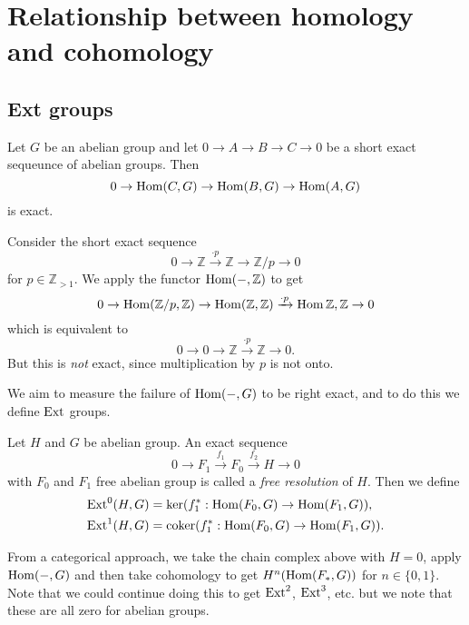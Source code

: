 \section{Relationship between homology and cohomology}

\subsection{Ext groups}

\begin{lemma}
    Let $G$ be an abelian group and let $0 \to A \to B \to C \to 0$ be a short exact sequeunce of abelian groups. Then
    \[ 0 \to \operatorname{Hom}(C,G) \to \operatorname{Hom}(B,G) \to \operatorname{Hom}(A,G) \]
    is exact.
\end{lemma}

\begin{example}
    Consider the short exact sequence
    \[ 0 \to \mathbb Z \xrightarrow{\cdot p} \mathbb Z \to \mathbb Z/p \to 0 \]
    for $p \in \mathbb Z_{> 1}$. We apply the functor $\operatorname{Hom}(-, \mathbb Z)$ to get
    \[ 0 \to \operatorname{Hom}(\mathbb Z/p, \mathbb Z) \to \operatorname{Hom}(\mathbb Z, \mathbb Z) \xrightarrow{\cdot p} \operatorname{Hom}{\mathbb Z, \mathbb Z} \to 0 \]
    which is equivalent to
    \[ 0 \to 0 \to \mathbb Z \xrightarrow{\cdot p} \mathbb Z \to 0. \]
    But this is \emph{not} exact, since multiplication by $p$ is not onto.
\end{example}

We aim to measure the failure of $\operatorname{Hom}(-, G)$ to be right exact, and to do this we define $\operatorname{Ext}$ groups.

\begin{definition}
    Let $H$ and $G$ be abelian group. An exact sequence
    \[ 0 \to F_1 \xrightarrow{f_1} F_0 \xrightarrow{f_2} H \to 0 \]
    with $F_0$ and $F_1$ free abelian group is called a \emph{free resolution} of $H$. Then we define
    \begin{align*}
        \operatorname{Ext}^0(H, G) & = \ker(f_1^*: \operatorname{Hom}(F_0, G) \to \operatorname{Hom}(F_1, G)),   \\
        \operatorname{Ext}^1(H, G) & = \operatorname{coker}(f_1^*: \operatorname{Hom}(F_0, G) \to \operatorname{Hom}(F_1, G)).
    \end{align*}
\end{definition}

From a categorical approach, we take the chain complex above with $H = 0$, apply $\operatorname{Hom}(-, G)$ and then take cohomology to get $H^n(\operatorname{Hom}(F_*, G))$ for $n \in \{0, 1\}$. Note that we could continue doing this to get $\operatorname{Ext}^2$, $\operatorname{Ext}^3$, etc. but we note that these are all zero for abelian groups.

